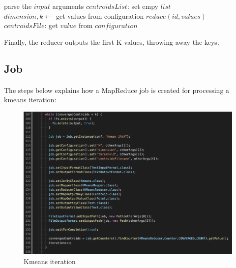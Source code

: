 \documentclass{book}
\begin{document}
    \begin{algorithm}[H]
        \SetAlgoLined
        \BlankLine
        parse the $input$ arguments\;
        $centroidsList$: set empy $list$\;
        \BlankLine
            \\
        $dimension, k\leftarrow$ get values from configuration\;
        $reduce(id, values)$\;
        \BlankLine
        \\
        $centroidsFile$: get $value$ from $configuration$\;
        \caption{$REDUCE(id, values)$}
    \end{algorithm}

    Finally, the reducer outputs the first K values, throwing away the keys. 

    \clearpage
    \subsection{Job}
    \paragraph{}

    The steps below explains how a MapReduce job is created for processing a kmeans iteration: 

    \begin{figure}[H]
        \includegraphics[width=12cm]{code/converged_centroids}
        \centering
        \caption{Kmeans iteration}
    \end{figure}
\end{document}
